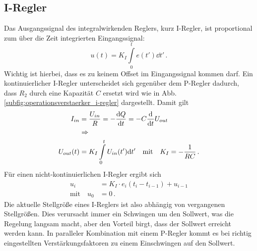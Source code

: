 \subsection{I-Regler}\label{i-regler}
Das Ausgangssignal des integralwirkenden Reglers, kurz I-Regler, ist
proportional zum über die Zeit integrierten Eingangssignal:
\begin{equation}\label{eq:i-regler_01}
	u(t)=K_I\int\limits_0^te(t')\dd{t'}\,.
\end{equation}
Wichtig ist hierbei, dass es zu keinem Offset im Eingangssignal kommen darf. Ein
kontinuierlicher I-Regler unterscheidet sich gegenüber dem P-Regler dadurch, dass $R_2$ durch eine
Kapazität $C$ ersetzt wird wie in Abb.
\ref{subfig:operationsverstaerker_i-regler} dargestellt. Damit gilt
\begin{equation}\label{eq:i-regler_02}
	\begin{split}
		I_{in}&=\frac{U_{in}}{R}=-\frac{\mathrm{d} Q}{\mathrm{d} t}=-C\frac{\mathrm{d} }{\mathrm{d} t}U_{out}\\
		&\Rightarrow\\
		U_{out}(t)&=K_I\int\limits_0^tU_{in}(t')\mathrm{d}{t'}
		\quad\text{mit}\quad
		K_I=-\frac{1}{RC}\,.
	\end{split}
\end{equation}
Für einen nicht-kontinuierlichen I-Regler ergibt sich
\begin{equation}\label{eq:i-regler_03}
	\begin{split}
		u_i&=K_I\cdot e_i(t_i-t_{i-1})+u_{i-1}\\
		\text{mit}\quad
		u_{0}&=0\,.
	\end{split}
\end{equation}
Die aktuelle Stellgröße eines I-Reglers ist also abhängig von vergangenen
Stellgrößen. Dies verursacht immer ein Schwingen um den Sollwert, was die
Regelung langsam macht, aber den Vorteil birgt, dass der Sollwert erreicht
werden kann. In paralleler Kombination mit einem P-Regler kommt es bei richtig
eingestellten Verstärkungsfaktoren zu einem Einschwingen auf den Sollwert.


